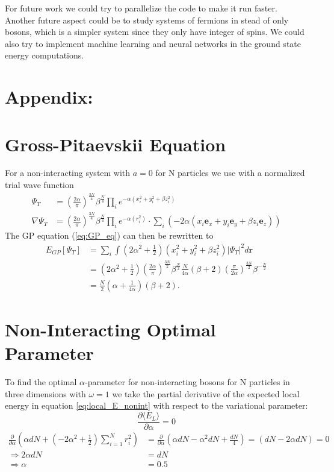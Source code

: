 \documentclass[12pt,a4paper,english]{article}
\begin{document}
For future work we could try to parallelize the code to make it run faster. Another future aspect could be to study systems of fermions in stead of only bosons, which is a simpler system since they only have integer of spins. We could also try to implement machine learning and neural networks in the ground state energy computations.

\appendix
\section*{Appendix:}
\section{Gross-Pitaevskii Equation}
\label{appendix:GP_eq}
For a non-interacting system with $a=0$ for N particles we use with a normalized trial wave function 
\begin{align}
\label{eq:norm_WF_T}
\Psi_T&=\left(\frac{2\alpha}{\pi}\right)^{\frac{3N}{4}}\beta^{\frac{N}{4}}\prod_{i}e^{-\alpha(x_i^2+y_i^2+\beta z_i^2)}\\
\nabla\Psi_T&=\left(\frac{2\alpha}{\pi}\right)^{\frac{3N}{4}}\beta^{\frac{N}{4}}\prod_{i}e^{-\alpha(r_i^2)}\cdot\sum_i(-2\alpha(x_i\textbf{e}_x+y_i\textbf{e}_y+\beta z_i\textbf{e}_z))
\end{align}
The GP equation (\ref{eq:GP_eq}) can then be rewritten to
\begin{align*}
E_{GP}[\Psi_T]&=\sum_i\int(2\alpha^2+\frac{1}{2})(x_i^2+y_i^2+\beta z_i^2)|\Psi_T|^2d\textbf{r}\nonumber\\
&=(2\alpha^2+\frac{1}{2})\left(\frac{2\alpha}{\pi}\right)^{\frac{3N}{2}}\beta^{\frac{N}{2}}\frac{N}{4\alpha}(\beta+2)\left(\frac{\pi}{2\alpha}\right)^{\frac{3N}{2}}\beta^{-\frac{N}{2}}\nonumber\\
&=\frac{N}{2}\left(\alpha+\frac{1}{4\alpha}\right)(\beta+2).
\end{align*}

\section{Non-Interacting Optimal Parameter}
\label{appendix:Optimal_alpha}
To find the optimal $\alpha$-parameter for non-interacting bosons for N particles in three dimensions with $\omega=1$ we take the partial derivative of the expected local energy in equation \ref{eq:local_E_nonint} with respect to the variational parameter:
\[\frac{\partial \langle E_L\rangle}{\partial \alpha}=0\]
\begin{align*}
\frac{\partial}{\partial \alpha}\left(\alpha dN+(-2\alpha^2+\frac{1}{2})\sum_{i=1}^{N}r_i^2\right)&=\frac{\partial}{\partial \alpha}\left(\alpha dN-\alpha^2dN+\frac{dN}{4}\right)=(dN-2\alpha dN)=0\\
\Rightarrow 2\alpha dN&=dN\\
\Rightarrow \alpha&=0.5
\end{align*}
\end{document}
